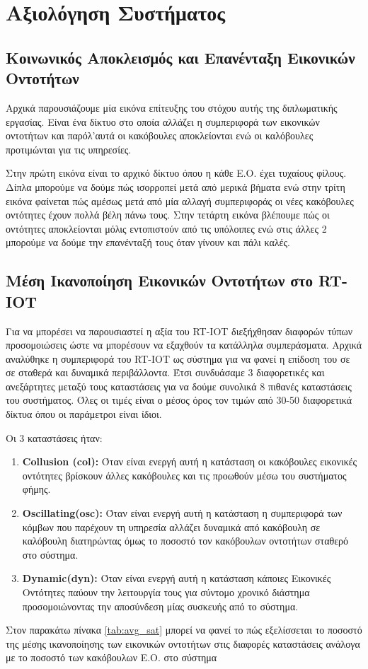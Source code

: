 \chapter{Aξιολόγηση Συστήματος}\label{ch:evaluation}

\section{Κοινωνικός Αποκλεισμός και Επανένταξη Εικονικών Οντοτήτων}
Αρχικά παρουσιάζουμε μία εικόνα επίτευξης του στόχου αυτής της διπλωματικής εργασίας. Είναι ένα δίκτυο στο οποία αλλάζει η συμπεριφορά των εικονικών οντοτήτων και παρόλ'αυτά οι κακόβουλες αποκλείονται ενώ οι καλόβουλες προτιμώνται για τις υπηρεσίες.


Στην πρώτη εικόνα είναι το αρχικό δίκτυο όπου η κάθε Ε.Ο. έχει τυχαίους φίλους. Δίπλα μπορούμε να δούμε πώς ισορροπεί μετά από μερικά βήματα ενώ στην τρίτη εικόνα φαίνεται πώς αμέσως μετά από μία αλλαγή συμπεριφοράς οι νέες κακόβουλες οντότητες έχουν πολλά βέλη πάνω τους. Στην τετάρτη εικόνα βλέπουμε πώς οι οντότητες αποκλείονται μόλις εντοπιστούν από τις υπόλοιπες ενώ στις άλλες 2 μπορούμε να δούμε την επανένταξή τους όταν γίνουν και πάλι καλές.
\newpage
\section{Μέση Ικανοποίηση Εικονικών Οντοτήτων στο RT-IOT}

Για να μπορέσει να παρουσιαστεί η αξία του RT-IOT διεξήχθησαν διαφορών τύπων προσομοιώσεις ώστε να μπορέσουν να εξαχθούν τα κατάλληλα συμπεράσματα. Αρχικά αναλύθηκε η συμπεριφορά του RT-IOT ως σύστημα για να φανεί η επίδοση του σε σε σταθερά και δυναμικά περιβάλλοντα. Έτσι συνδυάσαμε 3 διαφορετικές και ανεξάρτητες μεταξύ τους καταστάσεις για να δούμε συνολικά 8 πιθανές καταστάσεις του συστήματος. Όλες οι τιμές είναι ο μέσος όρος τον τιμών από 30-50 διαφορετικά δίκτυα όπου οι παράμετροι είναι ίδιοι.

Οι 3 καταστάσεις ήταν:
\begin{enumerate}
\item \textbf{Collusion (col):} Όταν είναι ενεργή αυτή η κατάσταση οι κακόβουλες εικονικές οντότητες βρίσκουν άλλες κακόβουλες και τις προωθούν μέσω του συστήματος φήμης.

\item\textbf{Οscillating(osc):} Όταν είναι ενεργή αυτή η κατάσταση η συμπεριφορά των κόμβων που παρέχουν τη υπηρεσία αλλάζει δυναμικά από κακόβουλη σε καλόβουλη διατηρώντας όμως το ποσοστό τον κακόβουλων οντοτήτων σταθερό στο σύστημα.

\item\textbf{Dynamic(dyn):} Όταν είναι ενεργή αυτή η κατάσταση κάποιες Εικονικές Οντότητες παύουν την λειτουργία τους για σύντομο χρονικό διάστημα προσομοιώνοντας την αποσύνδεση μίας συσκευής από το σύστημα.
\end{enumerate}
Στον παρακάτω πίνακα \ref{tab:avg_sat} μπορεί να φανεί το πώς εξελίσσεται το ποσοστό της μέσης ικανοποίησης των εικονικών οντοτήτων στις διαφορές καταστάσεις ανάλογα με το ποσοστό των κακόβουλων Ε.Ο. στο σύστημα


